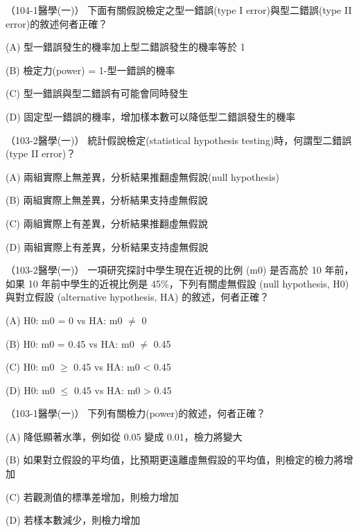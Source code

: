     \begin{docexam}{（104-1醫學(一)）}
        下面有關假說檢定之型一錯誤(type I error)與型二錯誤(type II error)的敘述何者正確？

        (A) 型一錯誤發生的機率加上型二錯誤發生的機率等於 1

        (B) 檢定力(power) = 1-型一錯誤的機率

        (C) 型一錯誤與型二錯誤有可能會同時發生

        (D) 固定型一錯誤的機率，增加樣本數可以降低型二錯誤發生的機率
    \end{docexam}

    \begin{docexam}{（103-2醫學(一)）}
        統計假說檢定(statistical hypothesis testing)時，何謂型二錯誤(type II error)？

        (A) 兩組實際上無差異，分析結果推翻虛無假說(null hypothesis)

        (B) 兩組實際上無差異，分析結果支持虛無假說

        (C) 兩組實際上有差異，分析結果推翻虛無假說

        (D) 兩組實際上有差異，分析結果支持虛無假說
    \end{docexam}
    
    \begin{docexam}{（103-2醫學(一)）}
        一項研究探討中學生現在近視的比例 (m0) 是否高於 10 年前，如果 10 年前中學生的近視比例是 45\%，下列有關虛無假設 (null hypothesis, H0) 與對立假設 (alternative hypothesis, HA) 的敘述，何者正確？

        (A) H0: m0 = 0 vs HA: m0 $\ne$ 0

        (B) H0: m0 = 0.45 vs HA: m0 $\ne$ 0.45

        (C) H0: m0 $\ge$ 0.45 vs HA: m0 < 0.45

        (D) H0: m0 $\le$ 0.45 vs HA: m0 > 0.45
    \end{docexam}
    
    \begin{docexam}{（103-1醫學(一)）}
        下列有關檢力(power)的敘述，何者正確？

        (A) 降低顯著水準，例如從 0.05 變成 0.01，檢力將變大

        (B) 如果對立假設的平均值，比預期更遠離虛無假設的平均值，則檢定的檢力將增加

        (C) 若觀測值的標準差增加，則檢力增加

        (D) 若樣本數減少，則檢力增加
    \end{docexam}
    
